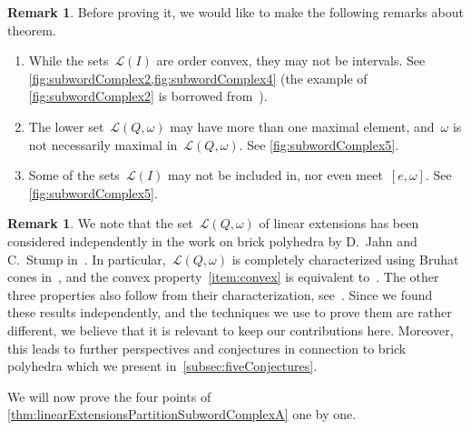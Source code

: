 \documentclass[reqno]{amsart}
\theoremstyle{definition}
\newtheorem{remark}[theorem]{Remark}
\newcommand{\linearExtensions}{\mathcal{L}} %
\begin{document}
\begin{remark}
\label{rem:linearExtensionsPartitionSubwordComplexA}
Before proving it, we would like to make the following remarks about theorem.
\begin{enumerate}
\item While the sets~$\linearExtensions(I)$ are order convex, they may not be intervals. See \cref{fig:subwordComplex2,fig:subwordComplex4} (the example of \cref{fig:subwordComplex2} is borrowed from~\cite[Figure~9]{PilaudStump-brickPolytope}).
\item The lower set~$\linearExtensions(Q,\omega)$ may have more than one maximal element, and~$\omega$ is not necessarily maximal in~$\linearExtensions(Q,\omega)$. See \cref{fig:subwordComplex5}.
\item Some of the sets~$\linearExtensions(I)$ may not be included in, nor even meet~$[e,\omega]$. See \cref{fig:subwordComplex5}.
\end{enumerate}
\end{remark}

\begin{remark}
We note that the set~$\linearExtensions(Q,\omega)$ of linear extensions has been considered independently in the work on brick polyhedra by D.~Jahn and C.~Stump in~\cite{JahnStump}. In particular,~$\linearExtensions(Q,\omega)$ is completely characterized using Bruhat cones in~\cite[Prop.~4.12]{JahnStump}, and the convex property~\eqref{item:convex} is equivalent to~\cite[Lem.~4.13]{JahnStump}. The other three properties also follow from their characterization, see~\cite[Sect.~4.2]{JahnStump}.  
Since we found these results independently, and the techniques we use to prove them are rather different, we believe that it is relevant to keep our contributions here. Moreover, this leads to further perspectives and conjectures in connection to brick polyhedra which we present in~\cref{subsec:fiveConjectures}. 
\end{remark}

We will now prove the four points of \cref{thm:linearExtensionsPartitionSubwordComplexA} one by one.
\end{document}
